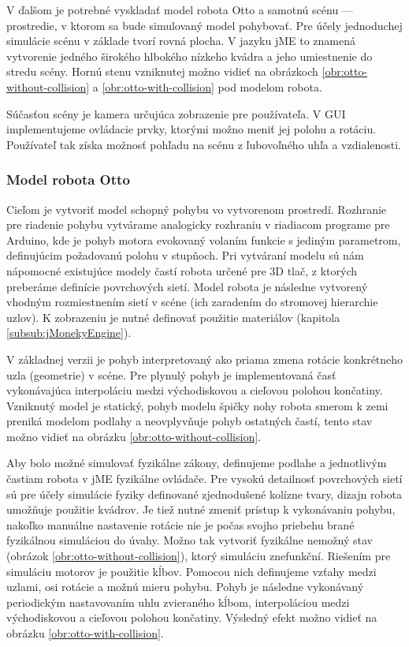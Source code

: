 V ďalšom je potrebné vyskladať model robota Otto a samotnú scénu --- prostredie, v ktorom sa bude simulovaný model pohybovať. Pre účely jednoduchej simulácie scénu v základe tvorí rovná plocha. V jazyku jME to znamená vytvorenie jedného širokého hlbokého nízkeho kvádra a jeho umiestnenie do stredu scény. Hornú stenu vzniknutej  možno vidieť na obrázkoch \ref{obr:otto-without-collision} a \ref{obr:otto-with-collision} pod modelom robota.

Súčasťou scény je kamera určujúca zobrazenie pre používateľa. V GUI implementujeme ovládacie prvky, ktorými možno meniť jej polohu a rotáciu. Používateľ tak získa možnosť pohľadu na scénu z ľubovoľného uhľa a vzdialenosti. 

\subsubsection{Model robota Otto}
Cieľom je vytvoriť model schopný pohybu vo vytvorenom prostredí. Rozhranie pre riadenie pohybu vytvárame analogicky rozhraniu v riadiacom programe pre Arduino, kde je pohyb motora evokovaný volaním funkcie s jediným parametrom, definujúcim požadovanú polohu v stupňoch. Pri vytváraní modelu sú nám nápomocné existujúce modely častí robota určené pre 3D tlač, z ktorých preberáme definície povrchových sietí. Model robota je následne vytvorený vhodným rozmiestnením sietí v scéne (ich zaradením do stromovej hierarchie uzlov). K zobrazeniu je nutné definovať použitie materiálov (kapitola \ref{subsub:jMonekyEngine}).

V základnej verzii je pohyb interpretovaný ako priama zmena rotácie konkrétneho uzla (geometrie) v scéne. Pre plynulý pohyb je implementovaná časť vykonávajúca interpoláciu medzi východiskovou a cieľovou polohou končatiny. Vzniknutý model je statický, pohyb modelu špičky nohy robota smerom k zemi preniká modelom podlahy a neovplyvňuje pohyb ostatných častí, tento stav možno vidieť na obrázku \ref{obr:otto-without-collision}.

Aby bolo možné simulovať fyzikálne zákony, definujeme podlahe a jednotlivým častiam robota v jME fyzikálne ovládače. Pre vysokú detailnosť povrchových sietí sú pre účely simulácie fyziky definované zjednodušené kolízne tvary, dizajn robota umožňuje použitie kvádrov. Je tiež nutné zmeniť prístup k vykonávaniu pohybu, nakoľko manuálne nastavenie rotácie nie je počas svojho priebehu brané fyzikálnou simuláciou do úvahy. Možno tak vytvoriť fyzikálne nemožný stav (obrázok \ref{obr:otto-without-collision}), ktorý simuláciu znefunkční. Riešením pre simuláciu motorov je použitie kĺbov. Pomocou nich definujeme vzťahy medzi uzlami, osi rotácie a možnú mieru pohybu. Pohyb je následne vykonávaný periodickým nastavovaním uhlu zvieraného kĺbom, interpoláciou medzi východiskovou a cieľovou polohou končatiny. Výsledný efekt možno vidieť na obrázku \ref{obr:otto-with-collision}.

